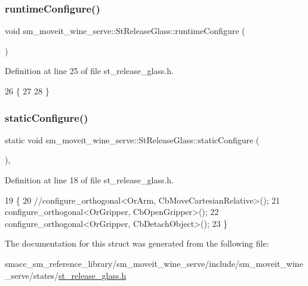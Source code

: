 \subsubsection{\texorpdfstring{runtime\+Configure()}{runtimeConfigure()}}
{\footnotesize\ttfamily void sm\+\_\+moveit\+\_\+wine\+\_\+serve\+::\+St\+Release\+Glass\+::runtime\+Configure (\begin{DoxyParamCaption}{ }\end{DoxyParamCaption})\hspace{0.3cm}{\ttfamily [inline]}}



Definition at line 25 of file st\+\_\+release\+\_\+glass.\+h.


\begin{DoxyCode}
26         \{
27           
28         \}
\end{DoxyCode}
\mbox{\label{structsm__moveit__wine__serve_1_1StReleaseGlass_a6a7d642023c9fe9fd9ad2d311690f1cc}} 
\subsubsection{\texorpdfstring{static\+Configure()}{staticConfigure()}}
{\footnotesize\ttfamily static void sm\+\_\+moveit\+\_\+wine\+\_\+serve\+::\+St\+Release\+Glass\+::static\+Configure (\begin{DoxyParamCaption}{ }\end{DoxyParamCaption})\hspace{0.3cm}{\ttfamily [inline]}, {\ttfamily [static]}}



Definition at line 18 of file st\+\_\+release\+\_\+glass.\+h.


\begin{DoxyCode}
19         \{
20             \textcolor{comment}{//configure\_orthogonal<OrArm, CbMoveCartesianRelative>();}
21             configure\_orthogonal<OrGripper, CbOpenGripper>();
22             configure\_orthogonal<OrGripper, CbDetachObject>();
23         \}
\end{DoxyCode}


The documentation for this struct was generated from the following file\+:\begin{DoxyCompactItemize}
\item 
smacc\+\_\+sm\+\_\+reference\+\_\+library/sm\+\_\+moveit\+\_\+wine\+\_\+serve/include/sm\+\_\+moveit\+\_\+wine\+\_\+serve/states/\hyperlink{st__release__glass_8h}{st\+\_\+release\+\_\+glass.\+h}\end{DoxyCompactItemize}
